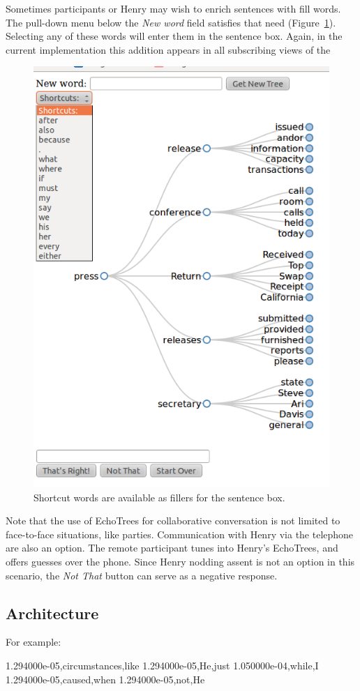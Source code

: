\documentclass{sigchi}
\begin{document}
Sometimes participants or Henry may wish to enrich sentences with fill
words. The pull-down menu below the {\em New word} field satisfies
that need (Figure~\ref{fig:shortcuts}). Selecting any of these words
will enter them in the sentence box. Again, in the current
implementation this addition appears in all subscribing views of the
\begin{figure}
   \centering
   \includegraphics[width=0.4\columnwidth]{Figs/echoTreePulldownSnapshotSmall.png}
   \caption{Shortcut words are available as fillers for the sentence box.}
   \label{fig:shortcuts}
\end{figure}
Note that the use of EchoTrees for collaborative conversation is not
limited to face-to-face situations, like parties. Communication
with Henry via the telephone are also an option. The remote
participant tunes into Henry's EchoTrees, and offers guesses over the
phone. Since Henry nodding assent is not an option in this scenario,
the {\em Not That} button can serve as a negative response.

\subsection{Architecture}

For example:

\hspace{1 cm}1.294000e-05,circumstances,like
\hspace{1 cm}1.294000e-05,He,just
\hspace{1 cm}1.050000e-04,while,I
\hspace{1 cm}1.294000e-05,caused,when
\hspace{1 cm}1.294000e-05,not,He
\end{document}

